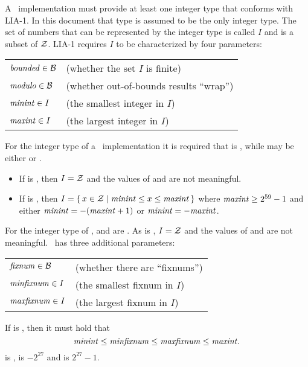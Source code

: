 \ifStd
A \StdErlang\ implementation must provide at least one integer type that
conforms with LIA-1.  In this document that type is assumed to be the
only integer type.
\fi
{}
The set of numbers that can be represented by the integer type is
called $I$ and is a subset of $\mathcal{Z}$.
LIA-1 requires $I$ to be characterized by four parameters:
\begin{textdisplay}
\begin{tabular}{@{}ll@{}}
${\it bounded}\in\mathcal{B}$ & (whether the set $I$ is finite) \\
${\it modulo}\in\mathcal{B}$ & (whether out-of-bounds results ``wrap'') \\
${\it minint}\in I$ & (the smallest integer in $I$) \\
${\it maxint}\in I$ & (the largest integer in $I$)
\end{tabular}
\end{textdisplay}
\ifStd
For the integer type of a \StdErlang\ implementation it is required
that  is , while  may be either 
or .
\begin{itemize}
\item If  is , then $I=\mathcal{Z}$ and the values of  and
 are not meaningful.
\item If  is , then
$I = \{\,x \in \mathcal{Z} \mid {\it minint} \leq x \leq {\it maxint}\,\}$
where
${\it maxint} \geq 2^{59}-1$ and either
${\it minint} = -({\it maxint}+1)$ or ${\it minint} = -{\it maxint}$.
\end{itemize}
\fi
\ifOld
For the integer type of \Erlang,  and  are .
As  is , $I=\mathcal{Z}$ and the values of  and
 are not meaningful.
\fi
{}
\Erlang\ has three additional parameters:
\begin{textdisplay}
\begin{tabular}{@{}ll@{}}
${\it fixnum}\in\mathcal{B}$ & (whether there are ``fixnums'') \\
${\it minfixnum}\in I$ & (the smallest fixnum in $I$) \\
${\it maxfixnum}\in I$ & (the largest fixnum in $I$)
\end{tabular}
\end{textdisplay}
\ifStd
If  is , then it must hold that
\[{\it minint} \leq {\it minfixnum} \leq {\it maxfixnum} \leq {\it maxint}.\]
\fi
\ifOld
{} is ,  is $-2^{27}$ and
 is $2^{27}-1$.
\fi
{}

